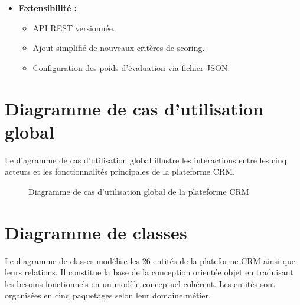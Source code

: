 \begin{itemize}[label=\textbullet, itemsep=5pt]
    \item \textbf{Extensibilité :}
    \begin{itemize}[itemsep=2pt]
        \item API REST versionnée.
        \item Ajout simplifié de nouveaux critères de scoring.
        \item Configuration des poids d'évaluation via fichier JSON.
    \end{itemize}

\end{itemize}

\section{Diagramme de cas d'utilisation global}
\label{sec:diagramme_cas_utilisation}

Le diagramme de cas d'utilisation global illustre les interactions entre les cinq acteurs et
les fonctionnalités principales de la plateforme CRM.

\begin{figure}[H]
    \centering
    \caption{Diagramme de cas d'utilisation global de la plateforme CRM}
    \label{fig:use_case_crm}
\end{figure}

\section{Diagramme de classes}
\label{sec:diagramme_classes}

Le diagramme de classes modélise les 26 entités de la plateforme CRM ainsi que leurs
relations. Il constitue la base de la conception orientée objet en traduisant les besoins
fonctionnels en un modèle conceptuel cohérent. Les entités sont organisées en cinq
paquetages selon leur domaine métier.

